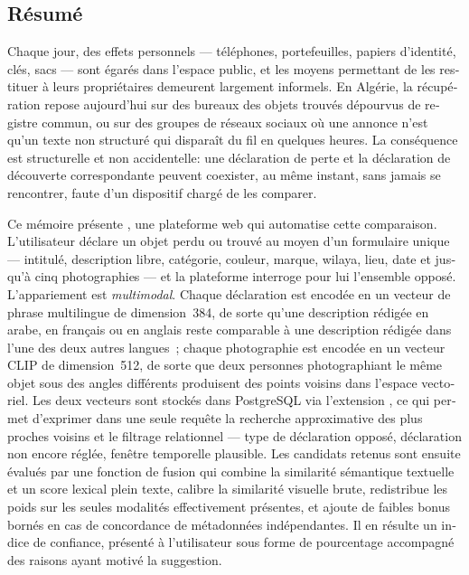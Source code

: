 \begin{otherlanguage}{french}
\chapter*{Résumé}

Chaque jour, des effets personnels --- téléphones, portefeuilles, papiers
d'identité, clés, sacs --- sont égarés dans l'espace public, et les moyens
permettant de les restituer à leurs propriétaires demeurent largement
informels. En Algérie, la récupération repose aujourd'hui sur des bureaux des
objets trouvés dépourvus de registre commun, ou sur des groupes de réseaux
sociaux où une annonce n'est qu'un texte non structuré qui disparaît du fil en
quelques heures. La conséquence est structurelle et non accidentelle: une
déclaration de perte et la déclaration de découverte correspondante peuvent
coexister, au même instant, sans jamais se rencontrer, faute d'un dispositif
chargé de les comparer.

Ce mémoire présente \projectname, une plateforme web qui automatise cette
comparaison. L'utilisateur déclare un objet perdu ou trouvé au moyen d'un
formulaire unique --- intitulé, description libre, catégorie, couleur, marque,
wilaya, lieu, date et jusqu'à cinq photographies --- et la plateforme interroge pour
lui l'ensemble opposé. L'appariement est \emph{multimodal}. Chaque déclaration
est encodée en un vecteur de phrase multilingue de dimension~384, de sorte
qu'une description rédigée en arabe, en français ou en anglais reste comparable
à une description rédigée dans l'une des deux autres langues~; chaque
photographie est encodée en un vecteur CLIP de dimension~512, de sorte que deux
personnes photographiant le même objet sous des angles différents produisent
des points voisins dans l'espace vectoriel. Les deux vecteurs sont stockés dans
PostgreSQL via l'extension , ce qui permet d'exprimer dans une
seule requête la recherche approximative des plus proches voisins et le
filtrage relationnel --- type de déclaration opposé, déclaration non encore
réglée, fenêtre temporelle plausible. Les candidats retenus sont ensuite évalués par une
fonction de fusion qui combine la similarité sémantique textuelle et un score
lexical plein texte, calibre la similarité visuelle brute, redistribue les
poids sur les seules modalités effectivement présentes, et ajoute de faibles
bonus bornés en cas de concordance de métadonnées indépendantes. Il en résulte
un indice de confiance, présenté à l'utilisateur sous forme de pourcentage
accompagné des raisons ayant motivé la suggestion.


\end{otherlanguage}
